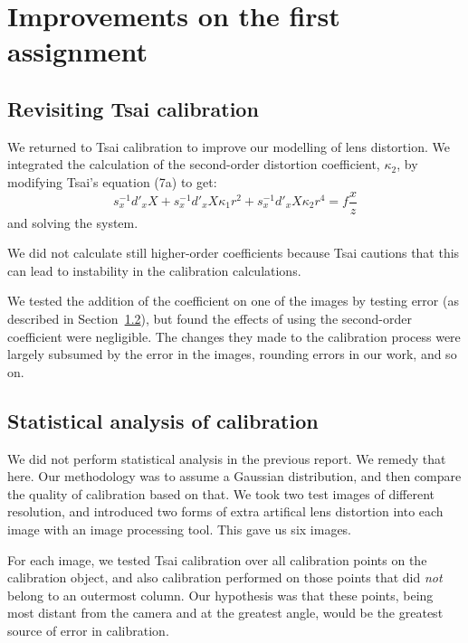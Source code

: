 
\section{Improvements on the first assignment}
\label{sec:improvements}

\subsection{Revisiting Tsai calibration}

%

We returned to Tsai calibration to improve our modelling of lens distortion. We integrated the calculation of the second-order distortion coefficient, $\kappa_{2}$, by modifying Tsai's equation (7a) to get: \cite{TSAI}
\[
	s_{x}^{-1}d'_{x}X + s_{x}^{-1}d'_{x}X\kappa_{1}r^{2} + s_{x}^{-1}d'_{x}X\kappa_{2}r^{4} = f\frac{x}{z}
\]
and solving the system.

We did not calculate still higher-order coefficients because Tsai cautions that this can lead to instability in the calibration calculations. \cite{TSAI}

We tested the addition of the coefficient on one of the images by testing error (as described in Section~\ref{sec:statcalibration}), but found the effects of using the second-order coefficient were negligible. The changes they made to the calibration process were largely subsumed by the error in the images, rounding errors in our work, and so on.

%

\subsection{Statistical analysis of calibration}
\label{sec:statcalibration}

We did not perform statistical analysis in the previous report. We remedy that here. Our methodology was to assume a Gaussian distribution, and then compare the quality of calibration based on that. We took two test images of different resolution, and introduced two forms of extra artifical lens distortion into each image with an image processing tool. This gave us six images.

For each image, we tested Tsai calibration over all calibration points on the calibration object, and also calibration performed on those points that did \emph{not} belong to an outermost column. Our hypothesis was that these points, being most distant from the camera and at the greatest angle, would be the greatest source of error in calibration.

